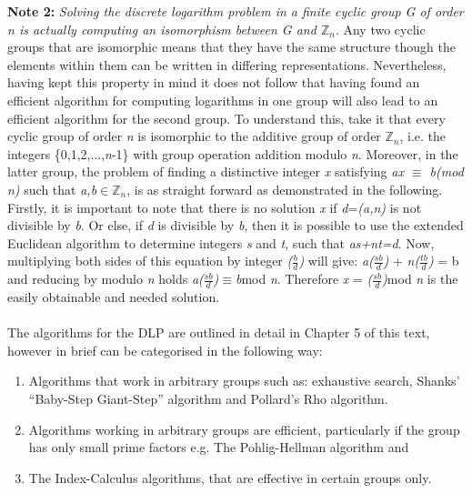 \documentclass[iwp,first]{luthesis}
\begin{document}
\textbf{Note 2:} \textit{Solving the discrete logarithm problem in a finite cyclic group G of order n is actually computing an isomorphism between G and $\mathbb{Z}_n$}. Any two cyclic groups that are isomorphic means that they have the same structure though the elements within them can be written in differing representations. Nevertheless, having kept this property in mind it does not follow that having found an efficient algorithm for computing logarithms in one group will also lead to an efficient algorithm for the second group. To understand this, take it that every cyclic group of order \textit{n} is isomorphic to the additive group of order $\mathbb{Z}_n$, i.e. the integers \{0,1,2,...,\textit{n}-1\} with group operation addition modulo \textit{n}. Moreover, in the latter group, the problem of finding a distinctive integer \textit{x} satisfying \textit{ax $\equiv$ b(mod n)} such that \textit{a,b$\in$}$\mathbb{Z}_n$, is as straight forward as demonstrated in the following. Firstly, it is important to note that there is no solution \textit{x} if \textit{d}=\textit{(a,n)} is not divisible by \textit{b}. Or else, if \textit{d} is divisible by \textit{b}, then it is possible to use the extended Euclidean algorithm to determine integers \textit{s} and \textit{t}, such that \textit{as+nt=d}. Now, multiplying both sides of this equation by integer \textit{($\frac{b}{d}$)} will give: \textit{a($\frac{sb}{d}$)} + \textit{n($\frac{tb}{d}$)} = b and reducing by modulo \textit{n} holds \textit{a($\frac{sb}{d}$)}$\equiv$\textit{b}mod \textit{n}. Therefore \textit{x} = \textit{($\frac{sb}{d}$)}mod \textit{n} is the easily obtainable and needed solution.
\\
\\
The algorithms for the DLP are outlined in detail in Chapter 5 of this text, however in brief can be categorised in the following way:

\begin{enumerate}

\item Algorithms that work in arbitrary groups such as:  exhaustive search, Shanks' ``Baby-Step Giant-Step'' algorithm and Pollard's Rho algorithm. 

\item Algorithms working in arbitrary groups are efficient, particularly if the group has only small prime factors e.g. The Pohlig-Hellman algorithm and

\item The Index-Calculus algorithms, that are effective in certain groups only.

\end{enumerate}
\end{document}

